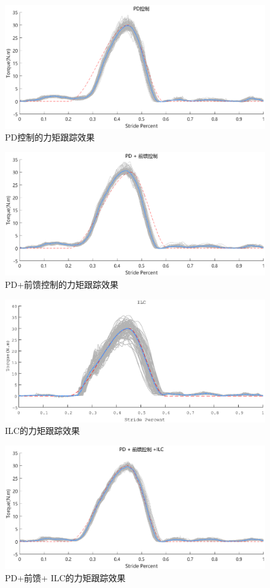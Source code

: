 \begin{figure}[htb]
    \includegraphics[width=17cm]{fig/f56.eps}
    \caption{PD控制的力矩跟踪效果}
    \label{fig:mark}
\end{figure}
\begin{figure}[!htb]
    \includegraphics[width=15cm]{fig/f57.eps}
    \caption{PD+前馈控制的力矩跟踪效果}
    \label{fig:mark}
\end{figure}
\begin{figure}[!htb]
    \includegraphics[width=15cm]{fig/f58.eps}
    \caption{ILC的力矩跟踪效果}
    \label{fig:mark}
\end{figure}
\begin{figure}[!htb]
    \includegraphics[width=15cm]{fig/f59.eps}
    \caption{PD+前馈+ ILC的力矩跟踪效果}
    \label{fig:mark}
\end{figure}

